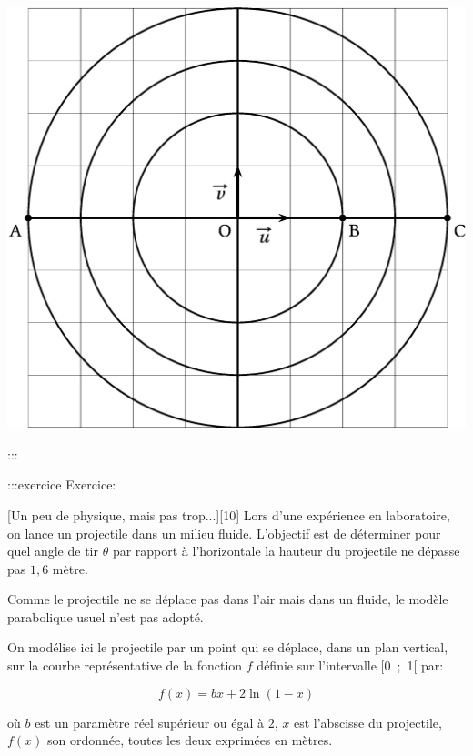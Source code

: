 \documentclass{cornouaille}
\begin{document}
\includegraphics{./TS-Complexes-Loga-1}




:::

\newpage



:::exercice Exercice:

[Un peu de physique, mais pas trop...][10]
Lors d'une expérience en laboratoire, on lance un projectile dans un milieu fluide. L'objectif est de déterminer pour quel angle de tir
$\theta$ par rapport à l'horizontale la hauteur du projectile ne dépasse
pas $1,6$ mètre.

Comme le projectile ne se déplace pas dans l'air mais dans un
fluide, le modèle parabolique usuel n'est pas adopté.

On modélise ici le projectile par un point qui se déplace, dans un
plan vertical, sur la courbe représentative de la fonction $f$ définie
sur l'intervalle [0~;~1[ par:


$$
f(x) = bx + 2\ln (1- x)
$$


où $b$ est un paramètre réel supérieur ou égal à $2$, $x$ est l'abscisse
du projectile, $f(x)$ son ordonnée, toutes les deux exprimées en mètres.



\end{document}
